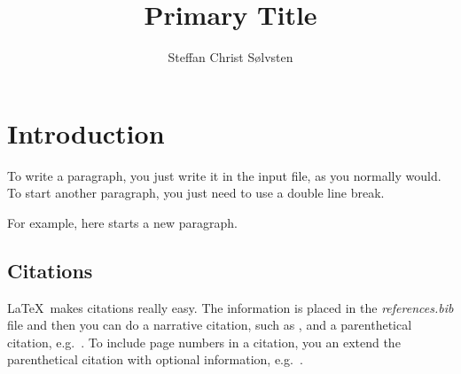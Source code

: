 \documentclass[
    a4paper, %
    stu,     %
]{apa7}
\title{Primary Title}
\author{Steffan Christ S{\o}lvsten}
\affiliation{Department of Computer Science, Aarhus University}
\begin{document}
\maketitle
\section{Introduction}
To write a paragraph, you just write it in the input file, as you normally
would. To start another paragraph, you just need to use a double line break.

For example, here starts a new paragraph.

\subsection{Citations}
\LaTeX\ makes citations really easy. The information is placed in the
\emph{references.bib} file and then you can do a narrative citation, such as
\textcite{soelvsten2022:TACAS}, and a parenthetical citation,
e.g.~\parencite{soelvsten2022:TACAS}. To include page numbers in a citation, you 
an extend the parenthetical citation with optional information,
e.g.~\parencite[p.~64]{soelvsten2022:TACAS}.

\printbibliography
\end{document}
